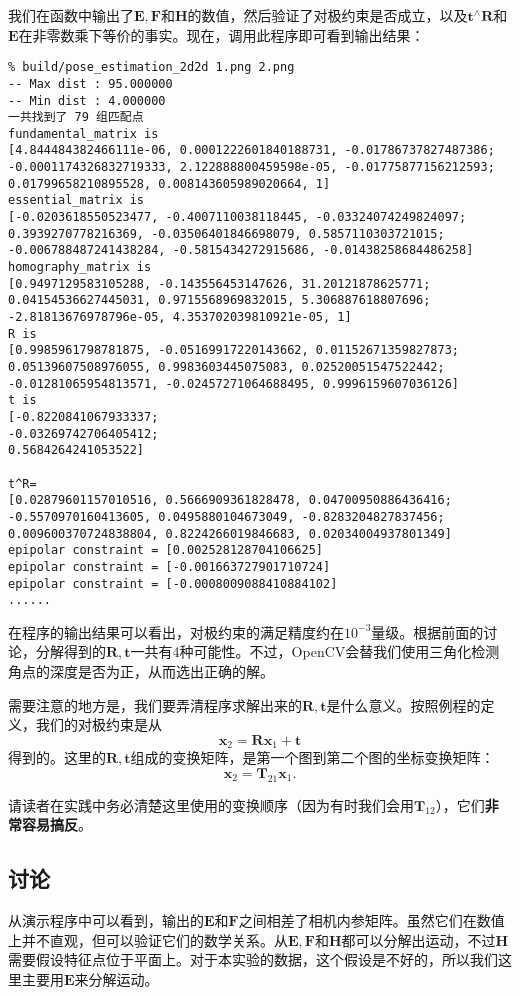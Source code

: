 我们在函数中输出了$\bm{E}, \bm{F}$和$\bm{H}$的数值，然后验证了对极约束是否成立，以及$\bm{t}^\wedge \bm{R}$和$\bm{E}$在非零数乘下等价的事实。现在，调用此程序即可看到输出结果：
\begin{lstlisting}
% build/pose_estimation_2d2d 1.png 2.png
-- Max dist : 95.000000 
-- Min dist : 4.000000 
一共找到了 79 组匹配点
fundamental_matrix is 
[4.844484382466111e-06, 0.0001222601840188731, -0.01786737827487386;
-0.0001174326832719333, 2.122888800459598e-05, -0.01775877156212593;
0.01799658210895528, 0.008143605989020664, 1]
essential_matrix is 
[-0.0203618550523477, -0.4007110038118445, -0.03324074249824097;
0.3939270778216369, -0.03506401846698079, 0.5857110303721015;
-0.006788487241438284, -0.5815434272915686, -0.01438258684486258]
homography_matrix is 
[0.9497129583105288, -0.143556453147626, 31.20121878625771;
0.04154536627445031, 0.9715568969832015, 5.306887618807696;
-2.81813676978796e-05, 4.353702039810921e-05, 1]
R is 
[0.9985961798781875, -0.05169917220143662, 0.01152671359827873;
0.05139607508976055, 0.9983603445075083, 0.02520051547522442;
-0.01281065954813571, -0.02457271064688495, 0.9996159607036126]
t is 
[-0.8220841067933337;
-0.03269742706405412;
0.5684264241053522]

t^R=
[0.02879601157010516, 0.5666909361828478, 0.04700950886436416;
-0.5570970160413605, 0.0495880104673049, -0.8283204827837456;
0.009600370724838804, 0.8224266019846683, 0.02034004937801349]
epipolar constraint = [0.002528128704106625]
epipolar constraint = [-0.001663727901710724]
epipolar constraint = [-0.0008009088410884102]
......
\end{lstlisting}

在程序的输出结果可以看出，对极约束的满足精度约在$10 ^{-3}$量级。根据前面的讨论，分解得到的$\bm{R}, \bm{t}$一共有4种可能性。不过，OpenCV会替我们使用三角化检测角点的深度是否为正，从而选出正确的解。

需要注意的地方是，我们要弄清程序求解出来的$\bm{R}, \bm{t}$是什么意义。按照例程的定义，我们的对极约束是从
\[
\bm{x}_2 = \bm{R} \bm{x}_1 + \bm{t}
\]
得到的。这里的$\bm{R}, \bm{t}$组成的变换矩阵，是第一个图到第二个图的坐标变换矩阵：
\begin{equation}
{\bm{x}}_2 = \bm{T}_{21} {\bm{x}}_1.
\end{equation}

请读者在实践中务必清楚这里使用的变换顺序（因为有时我们会用$\bm{T}_{12}$），它们\textbf{非常容易搞反}。

\subsection*{讨论}
从演示程序中可以看到，输出的$\bm{E}$和$\bm{F}$之间相差了相机内参矩阵。虽然它们在数值上并不直观，但可以验证它们的数学关系。从$\bm{E}, \bm{F}$和$\bm{H}$都可以分解出运动，不过$\bm{H}$需要假设特征点位于平面上。对于本实验的数据，这个假设是不好的，所以我们这里主要用$\bm{E}$来分解运动。

